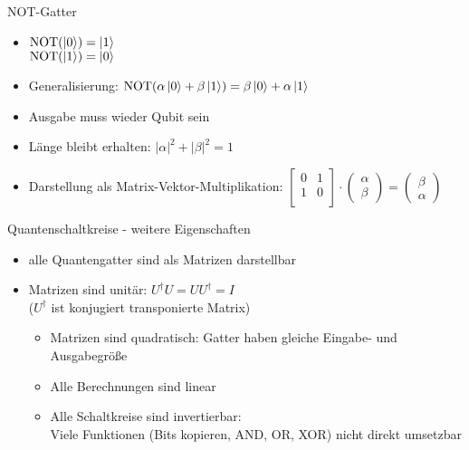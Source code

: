 \documentclass[xcolor=colortbl
,ngerman
]{beamer}
\begin{document}
\begin{frame}[t]{NOT-Gatter}
    \begin{itemize}
        \item \(
            \operatorname{NOT}(\left|0\right\rangle) = \left|1\right\rangle\) \\
            \(\operatorname{NOT}(\left|1\right\rangle) = \left|0\right\rangle
            \)

        \pause
        \item Generalisierung: \(
            \operatorname{NOT}(\alpha \left|0\right\rangle + \beta \left|1\right\rangle) = \beta \left|0\right\rangle + \alpha \left|1\right\rangle
        \)
        \pause
        \item Ausgabe muss wieder Qubit sein
        \item Länge bleibt erhalten: \(
            |\alpha|^2 + |\beta|^2 = 1 
            \)

        \pause
        \item Darstellung als Matrix-Vektor-Multiplikation: \(
            \begin{bmatrix}
                0 & 1 \\
                1 & 0 \\
            \end{bmatrix} \cdot 
            \begin{pmatrix}
                \alpha \\ \beta
            \end{pmatrix} = 
            \begin{pmatrix}
                \beta \\ \alpha
            \end{pmatrix} 
            \)
    \end{itemize}
\end{frame}

\begin{frame}{Quantenschaltkreise - weitere Eigenschaften}
    \begin{itemize}
        \item alle Quantengatter sind als Matrizen darstellbar
        \item Matrizen sind unitär: $U^\dagger U = U U^\dagger = I$ \\ 
            ($U^\dagger$ ist konjugiert transponierte Matrix)
        \begin{itemize}
            \item Matrizen sind quadratisch: Gatter haben gleiche Eingabe- und Ausgabegrö\ss e
            \item Alle Berechnungen sind linear
            \item Alle Schaltkreise sind invertierbar: \\
                Viele Funktionen (Bits kopieren, AND, OR, XOR) nicht direkt umsetzbar
        \end{itemize}
    \end{itemize}
\end{frame}
\end{document}
